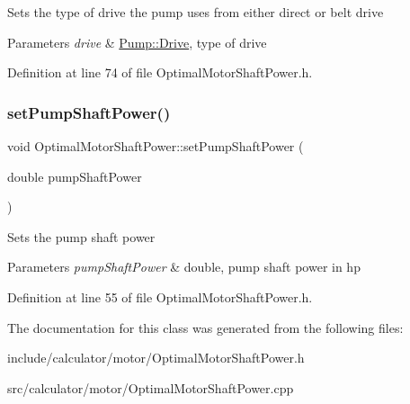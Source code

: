 Sets the type of drive the pump uses from either direct or belt drive


\begin{DoxyParams}{Parameters}
{\em drive} & \hyperlink{class_pump_a32bf0ade131a11bb3b3fb374f638e983}{Pump\+::\+Drive}, type of drive \\
\hline
\end{DoxyParams}


Definition at line 74 of file Optimal\+Motor\+Shaft\+Power.\+h.

\mbox{\label{class_optimal_motor_shaft_power_ab2d80927fbaa62705359700b2a8f2f26}} 
\subsubsection{\texorpdfstring{set\+Pump\+Shaft\+Power()}{setPumpShaftPower()}}
{\footnotesize\ttfamily void Optimal\+Motor\+Shaft\+Power\+::set\+Pump\+Shaft\+Power (\begin{DoxyParamCaption}\item[{double}]{pump\+Shaft\+Power }\end{DoxyParamCaption})\hspace{0.3cm}{\ttfamily [inline]}}

Sets the pump shaft power


\begin{DoxyParams}{Parameters}
{\em pump\+Shaft\+Power} & double, pump shaft power in hp \\
\hline
\end{DoxyParams}


Definition at line 55 of file Optimal\+Motor\+Shaft\+Power.\+h.



The documentation for this class was generated from the following files\+:\begin{DoxyCompactItemize}
\item 
include/calculator/motor/Optimal\+Motor\+Shaft\+Power.\+h\item 
src/calculator/motor/Optimal\+Motor\+Shaft\+Power.\+cpp\end{DoxyCompactItemize}
